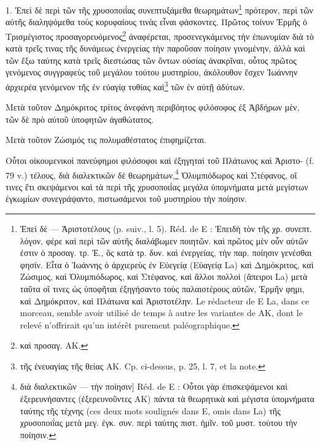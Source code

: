 \documentclass[a4paper, 11pt, oneside, polutonikogreek, french]{article}
\begin{document}
1. Ἐπεὶ δὲ περὶ τῶν τῆς χρυσοποιΐας συνεπτυξάμεθα θεωρημάτων\footnote{Ἐπεὶ δὲ --- Ἀριστοτέλους (p. suiv., l. 5). Réd. de E : Ἐπειδὴ τὸν τῆς χρ. συνεπτ. λόγον, φέρε καὶ περὶ τῶν αὐτῆς διαλάβωμεν ποιητῶν. καὶ πρῶτος μὲν οὖν αὐτῶν ἐστιν ὁ προσαγ. τρ. Ἑ., ὃς κατὰ τρ. δυν. καὶ ἐνεργείας, τὴν παρ. ποίησιν γενέσθαι φησίν. Εἶτα ὁ Ἰωάννης ὁ ἀρχιερεὺς ἐν Εὐεγείᾳ (Εὐαγείᾳ La) καὶ Δημόκριτος, καὶ Ζώσιμος, καὶ Ὀλυμπιόδωρος, καὶ Στέφανος, καὶ ἄλλοι πολλοὶ (ἄπειροι La) μετὰ ταῦτα οἵ τινες ὡς ὑποφῆται ἐξηγήσαντο τοὺς παλαιοτέρους αὐτῶν, Ἑρμῆν φημι, καὶ Δημόκριτον, καὶ Πλάτωνα καὶ Ἀριστοτέλην. Le rédacteur de E La, dans ce morceau, semble avoir utilisé de temps à autre les variantes de AK, dont le relevé n'offrirait qu'un intérêt purement paléographique.} πρότερον, περὶ τῶν αὐτῆς διαληψόμεθα τοὺς κορυφαίους τινὰς εἶναι φάσκοντες. Πρῶτος τοίνυν Ἑρμῆς ὁ Τρισμέγιστος προσαγορευόμενος\footnote{καὶ προσαγ. AK.} ἀναφέρεται, προσενεγκάμενος τὴν ἐπωνυμίαν διὰ τὸ κατὰ τρεῖς τινας τῆς δυνάμεως ἐνεργείας τὴν παροῦσαν ποίησιν γινομένην, ἀλλὰ καὶ τῶν ἔξω ταύτης κατὰ τρεῖς διεστώσας τῶν ὄντων οὐσίας ἀνακρῖναι, οὗτος πρῶτος γενόμενος συγγραφεὺς τοῦ μεγάλου τούτου μυστηρίου, ἀκόλουθον ἔσχεν Ἰωάννην ἀρχιερέα γενόμενον τῆς ἐν εὐαγίᾳ τυθίας καὶ\footnote{τῆς ἐνευαγίας τῆς θείας AK. Cp. ci-dessus, p. 25, l. 7, et la note.} τῶν ἐν αὐτῇ ἀδύτων.

Μετὰ τοῦτον Δημόκριτος τρίτος ἀνεφάνη περιβόητος φιλόσοφος ἐξ Ἀβδήρων μὲν, τῶν δὲ πρὸ αὐτοῦ ὑποφητῶν ἀγαθώτατος.

Μετὰ τοῦτον Ζώσιμός τις πολυμαθέστατος ἐπιφημίζεται.

Οὗτοι οἰκουμενικοὶ πανεύφημοι φιλόσοφοι καὶ ἐξηγηταὶ τοῦ Πλάτωνος καὶ Ἀριστο- (f. 79 v.) τέλους, διὰ διαλεκτικῶν δὲ θεωρημάτων,\footnote{διὰ διαλεκτικῶν --- τὴν ποίησιν] Réd. de E : Οὗτοι γὰρ ἐπισκεψάμενοι καὶ ἐξερευνήσαντες (ἐξερευνοῦντες AK) πάντα τὰ θεωρητικὰ καὶ μέγιστα ὑπομνήματα ταύτης τῆς τέχνης (ces deux mots soulignés dans E, omis dans La) τῆς χρυσοποιΐας μετὰ μεγ. ἐγκ. συν. περὶ ταύτης πιστ. ἡμῖν. τοῦ μυστ. τούτου τὴν ποίησιν.} Ὀλυμπιόδωρος καὶ Στέφανος, οἵ τινες ἔτι σκεψάμενοι καὶ τὰ περὶ τῆς χρυσοποιΐας μεγάλα ὑπομνήματα μετὰ μεγίστων ἐγκωμίων συνεγράψαντο, πιστωσάμενοι τοῦ μυστηρίου τὴν ποίησιν.
\end{document}

